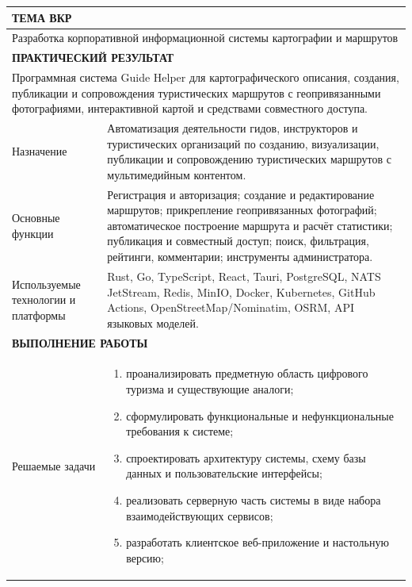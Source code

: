 \footnotesize
\begin{tabular}{|p{\assignmentlabelwidth}|p{\assignmentvaluewidth}|}
\hline
\multicolumn{2}{|p{\assignmentfullwidth}|}{\textbf{ТЕМА ВКР}} \\
\hline
\multicolumn{2}{|p{\assignmentfullwidth}|}{Разработка корпоративной информационной системы картографии и маршрутов} \\
\hline
\multicolumn{2}{|p{\assignmentfullwidth}|}{\textbf{ПРАКТИЧЕСКИЙ РЕЗУЛЬТАТ}} \\
\hline
\multicolumn{2}{|p{\assignmentfullwidth}|}{Программная система Guide Helper для картографического описания, создания, публикации и сопровождения туристических маршрутов с геопривязанными фотографиями, интерактивной картой и средствами совместного доступа.} \\
\hline
Назначение & Автоматизация деятельности гидов, инструкторов и туристических организаций по созданию, визуализации, публикации и сопровождению туристических маршрутов с мультимедийным контентом. \\
\hline
Основные функции & Регистрация и авторизация; создание и редактирование маршрутов; прикрепление геопривязанных фотографий; автоматическое построение маршрута и расчёт статистики; публикация и совместный доступ; поиск, фильтрация, рейтинги, комментарии; инструменты администратора. \\
\hline
Используемые технологии и платформы & Rust, Go, TypeScript, React, Tauri, PostgreSQL, NATS JetStream, Redis, MinIO, Docker, Kubernetes, GitHub Actions, OpenStreetMap/Nominatim, OSRM, API языковых моделей. \\
\hline
\multicolumn{2}{|p{\assignmentfullwidth}|}{\textbf{ВЫПОЛНЕНИЕ РАБОТЫ}} \\
\hline
Решаемые задачи &
\begin{minipage}[t]{\assignmentvaluewidth}
\vspace{2pt}
\begin{enumerate}
\item проанализировать предметную область цифрового туризма и существующие аналоги;
\item сформулировать функциональные и нефункциональные требования к системе;
\item спроектировать архитектуру системы, схему базы данных и пользовательские интерфейсы;
\item реализовать серверную часть системы в виде набора взаимодействующих сервисов;
\item разработать клиентское веб-приложение и настольную версию;

\end{enumerate}
\end{minipage}
\end{tabular}
